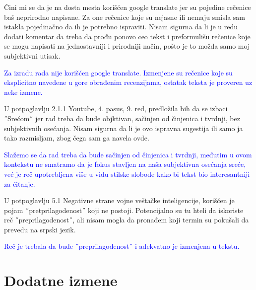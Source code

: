 \documentclass[a4paper]{report}
\newcommand{\odgovor}[1]{\textcolor{blue}{#1}}
\begin{document}
Čini mi se da je na dosta mesta korišćen google translate jer su pojedine rečenice baš neprirodno napisane. Za one rečenice koje su nejasne ili nemaju smisla sam istakla pojedinačno da ih je potrebno ispraviti. Nisam sigurna da li je u redu dodati komentar da treba da prođu ponovo ceo tekst i preformulišu rečenice koje se mogu napisati na jednostavniji i prirodniji način, pošto je to možda samo moj subjektivni utisak.

\odgovor{Za izradu rada nije korišćen google translate. Izmenjene su rečenice koje su eksplicitno navedene u gore obrađenim recenzijama, ostatak teksta je proveren uz neke izmene.}

U potpoglavlju 2.1.1 Youtube, 4. pasus, 9. red, predložila bih da se izbaci ˝Srećom˝ jer rad treba da bude objktivan, sačinjen od činjenica i tvrdnji, bez subjektivnih osećanja. Nisam sigurna da li je ovo ispravna sugestija ili samo ja tako razmisljam, zbog čega sam ga navela ovde.

\odgovor{Slažemo se da rad treba da bude sačinjen od činjenica i tvrdnji, međutim u ovom kontekstu ne smatramo da je fokus stavljen na naša subjektivna osećanja sreće, već je reč upotrebljena više u vidu stilske slobode kako bi tekst bio interesantniji za čitanje.}

U potpoglavlju 5.1 Negativne strane vojne veštačke inteligencije, korišćen je pojam ˝pretprilagodenost˝ koji ne postoji. Potencijalno su tu hteli da iskoriste reč ˝preprilagodenost˝, ali nisam mogla da pronađem koji termin su pokušali da prevedu na srpski jezik.

\odgovor{Reč je trebala da bude ˝preprilagođenost˝ i adekvatno je izmenjena u tekstu.}

\chapter{Dodatne izmene}
\end{document}
